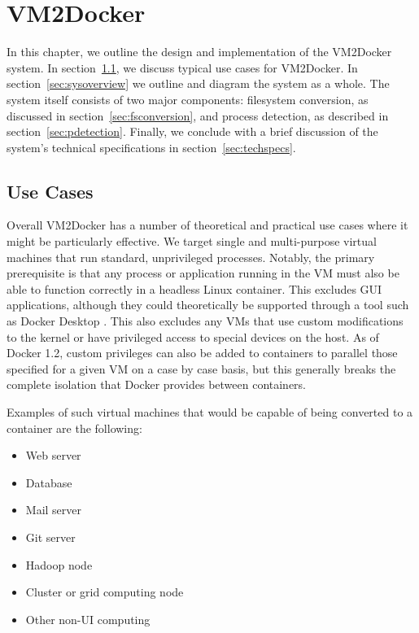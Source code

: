 \chapter{VM2Docker}
\label{chap:vm2docker}
In this chapter, we outline the design and implementation of the VM2Docker system. In section~\ref{sec:usecases}, we discuss typical use cases for VM2Docker. In section~\ref{sec:sysoverview} we outline and diagram the system as a whole. The system itself consists of two major components: filesystem conversion, as discussed in section~\ref{sec:fsconversion}, and process detection, as described in section~\ref{sec:pdetection}. Finally, we conclude with a brief discussion of the system's technical specifications in section~\ref{sec:techspecs}.

\section{Use Cases}
\label{sec:usecases}
Overall VM2Docker has a number of theoretical and practical use cases where it might be particularly effective. We target single and multi-purpose virtual machines that run standard, unprivileged processes. Notably, the primary prerequisite is that any process or application running in the VM must also be able to function correctly in a headless Linux container. This excludes GUI applications, although they could theoretically be supported through a tool such as Docker Desktop \cite{ddesktop}. This also excludes any VMs that use custom modifications to the kernel or have privileged access to special devices on the host. As of Docker 1.2, custom privileges can also be added to containers to parallel those specified for a given VM on a case by case basis, but this generally breaks the complete isolation that Docker provides between containers.

Examples of such virtual machines that would be capable of being converted to a container are the following:
\begin{itemize}
\item Web server
\item Database
\item Mail server
\item Git server
\item Hadoop node
\item Cluster or grid computing node
\item Other non-UI computing
\end{itemize}

